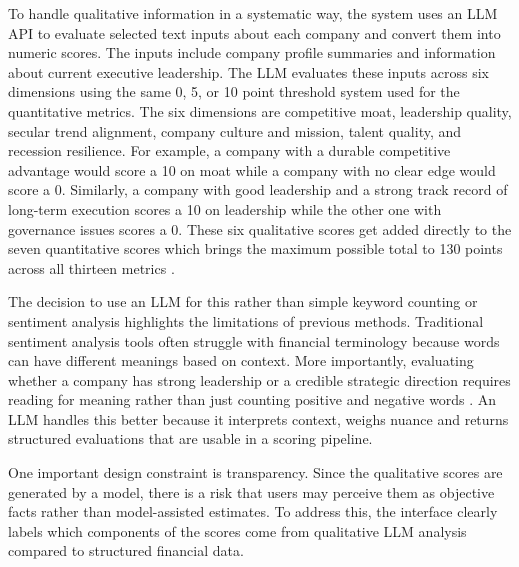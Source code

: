 \documentclass[12pt]{article}
\begin{document}
To handle qualitative information in a systematic way, the system uses an LLM API to evaluate selected text inputs about each company and convert them into numeric scores. The inputs include company profile summaries and information about current executive leadership. The LLM evaluates these inputs across six dimensions using the same 0, 5, or 10 point threshold system used for the quantitative metrics. The six dimensions are competitive moat, leadership quality, secular trend alignment, company culture and mission, talent quality, and recession resilience. For example, a company with a durable competitive advantage would score a 10 on moat while a company with no clear edge would score a 0. Similarly, a company with good leadership and a strong track record of long-term execution scores a 10 on leadership while the other one with governance issues scores a 0. These six qualitative scores get added directly to the seven quantitative scores which brings the maximum possible total to 130 points across all thirteen metrics \cite{Schumaker2009Textual, dos-santos-pinheiro-dras-2017-stock}.

The decision to use an LLM for this rather than simple keyword counting or sentiment analysis highlights the limitations of previous methods. Traditional sentiment analysis tools often struggle with financial terminology because words can have different meanings based on context. More importantly, evaluating whether a company has strong leadership or a credible strategic direction requires reading for meaning rather than just counting positive and negative words \cite{dos-santos-pinheiro-dras-2017-stock}. An LLM handles this better because it interprets context, weighs nuance and returns structured evaluations that are usable in a scoring pipeline.

One important design constraint is transparency. Since the qualitative scores are generated by a model, there is a risk that users may perceive them as objective facts rather than model-assisted estimates. To address this, the interface clearly labels which components of the scores come from qualitative LLM analysis compared to structured financial data.
\end{document}
